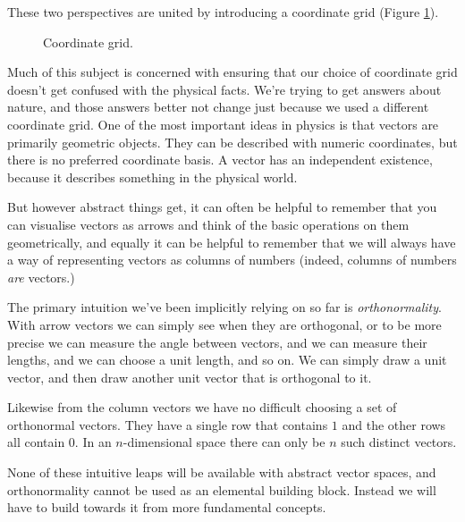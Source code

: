 These two perspectives are united by introducing a coordinate grid (Figure \ref{fig:vector-coordinate-grid}).

\begin{figure}[h]
    \centering
    \caption{Coordinate grid.} \label{fig:vector-coordinate-grid}
\end{figure}

Much of this subject is concerned with ensuring that our choice of coordinate grid doesn't get confused with the physical facts. We're trying to get answers about nature, and those answers better not change just because we used a different coordinate grid. One of the most important ideas in physics is that vectors are primarily geometric objects. They can be described with numeric coordinates, but there is no preferred coordinate basis. A vector has an independent existence, because it describes something in the physical world.

But however abstract things get, it can often be helpful to remember that you can visualise vectors as arrows and think of the basic operations on them geometrically, and equally it can be helpful to remember that we will always have a way of representing vectors as columns of numbers (indeed, columns of numbers \textit{are} vectors.)

The primary intuition we've been implicitly relying on so far is \textit{orthonormality}. With arrow vectors we can simply see when they are orthogonal, or to be more precise we can measure the angle between vectors, and we can measure their lengths, and we can choose a unit length, and so on. We can simply draw a unit vector, and then draw another unit vector that is orthogonal to it.

Likewise from the column vectors we have no difficult choosing a set of orthonormal vectors. They have a single row that contains $1$ and the other rows all contain $0$. In an $n$-dimensional space there can only be $n$ such distinct vectors.

None of these intuitive leaps will be available with abstract vector spaces, and orthonormality cannot be used as an elemental building block. Instead we will have to build towards it from more fundamental concepts.

